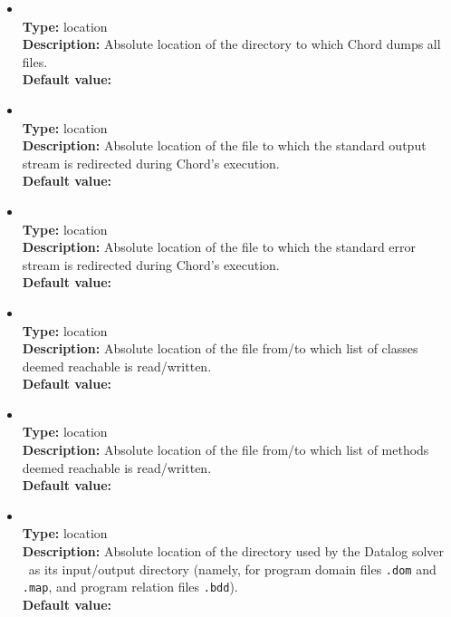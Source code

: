 \begin{itemize}
\item
{} \\
{\bf Type:} location \\
{\bf Description:} Absolute location of the directory to which Chord dumps all files. \\
{\bf Default value:}  

\item
{} \\
{\bf Type:} location \\
{\bf Description:} Absolute location of the file to which the standard output stream is redirected during Chord's execution. \\
{\bf Default value:} 

\item
{} \\
{\bf Type:} location \\
{\bf Description:} Absolute location of the file to which the standard error stream is redirected during Chord's execution. \\
{\bf Default value:} 

\item
{} \\
{\bf Type:} location \\
{\bf Description:} Absolute location of the file from/to which list of classes deemed reachable is read/written. \\
{\bf Default value:} 

\item
{} \\
{\bf Type:} location \\
{\bf Description:} Absolute location of the file from/to which list of methods deemed reachable is read/written. \\
{\bf Default value:} 

\item
{} \\
{\bf Type:} location \\
{\bf Description:} Absolute location of the directory used by the Datalog solver \bddbddb\ as its input/output directory (namely, for program domain files {\tt *.dom} and {\tt *.map}, and program relation files {\tt *.bdd}). \\
{\bf Default value:} 


\end{itemize}
